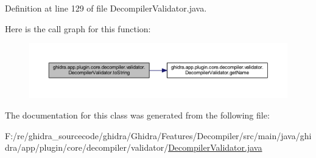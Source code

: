 Definition at line 129 of file Decompiler\+Validator.\+java.

Here is the call graph for this function\+:
\nopagebreak
\begin{figure}[H]
\begin{center}
\leavevmode
\includegraphics[width=350pt]{classghidra_1_1app_1_1plugin_1_1core_1_1decompiler_1_1validator_1_1_decompiler_validator_a6f5f4f64b44aeb756ed050b65834c02e_cgraph}
\end{center}
\end{figure}


The documentation for this class was generated from the following file\+:\begin{DoxyCompactItemize}
\item 
F\+:/re/ghidra\+\_\+sourcecode/ghidra/\+Ghidra/\+Features/\+Decompiler/src/main/java/ghidra/app/plugin/core/decompiler/validator/\mbox{\hyperlink{_decompiler_validator_8java}{Decompiler\+Validator.\+java}}\end{DoxyCompactItemize}
